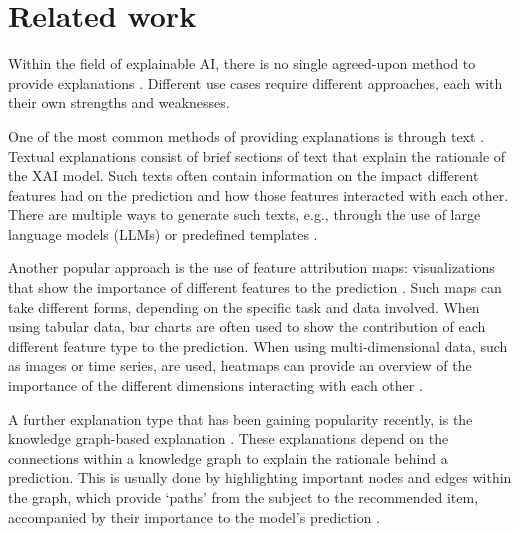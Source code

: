 \section{Related work}


Within the field of explainable AI, there is no single agreed-upon method to provide explanations \cite{arya2019one}. Different use cases require different approaches, each with their own strengths and weaknesses. 

One of the most common methods of providing explanations is through text \cite{goebel2018explainable,poli2021generation,szymanski2021visual}. Textual explanations consist of brief sections of text that explain the rationale of the XAI model. Such texts often contain information on the impact different features had on the prediction and how those features interacted with each other. There are multiple ways to generate such texts, e.g., through the use of large language models (LLMs) \cite{menon2022visual} or predefined templates \cite{wrede2022linguistic}. 

Another popular approach is the use of feature attribution maps: visualizations that show the importance of different features to the prediction \cite{palacio2021xai}. Such maps can take different forms, depending on the specific task and data involved. When using tabular data, bar charts are often used to show the contribution of each different feature type to the prediction. When using multi-dimensional data, such as images or time series, are used, heatmaps can provide an overview of the importance of the different dimensions interacting with each other \cite{fauvel2021xcm}. 

A further explanation type that has been gaining popularity recently, is the knowledge graph-based explanation \cite{tiddi2022knowledge}. These explanations depend on the connections within a knowledge graph to explain the rationale behind a prediction. This is usually done by highlighting important nodes and edges within the graph, which provide `paths' from the subject to the recommended item, accompanied by their importance to the model's prediction \cite{wang2019kgat}. 



